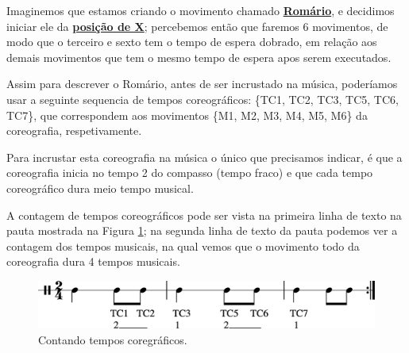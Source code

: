 \begin{example}
Imaginemos que estamos criando o movimento chamado \hyperref[subsec:passo:romario]{\textbf{Romário}},
e decidimos iniciar ele da \hyperref[def:X-position]{\textbf{posição de X}}; 
percebemos então que faremos 6 movimentos,
de modo que o terceiro e sexto tem o tempo de espera dobrado, 
em relação aos demais movimentos que tem o mesmo tempo de espera apos serem executados.

Assim para descrever o Romário, antes de ser incrustado na música, 
poderíamos usar a seguinte sequencia de tempos coreográficos: \{TC1, TC2, TC3, TC5, TC6, TC7\},
que correspondem aos movimentos \{M1, M2, M3, M4, M5, M6\} da coreografia, respetivamente.

Para incrustar esta coreografia na música o único que precisamos indicar,
é que a coreografia inicia no tempo 2 do compasso (tempo fraco)
e que cada tempo coreográfico dura meio tempo musical.

A contagem de tempos coreográficos pode ser vista na primeira linha de texto na pauta mostrada na Figura \ref{fig:contagemtempocoreografico};
na segunda linha de texto da pauta podemos ver a contagem dos tempos musicais,
na qual vemos que o movimento todo da coreografia dura 4 tempos musicais.
\end{example}

\begin{figure}[!h]
    \centering
    \includegraphics[width=\textwidth]{chapters/cap-musicalidade/abc-contagemtempocoreografico-1.eps}

    \vspace{-10pt}
    \caption{Contando tempos coregráficos.}
    \label{fig:contagemtempocoreografico}
\end{figure}


